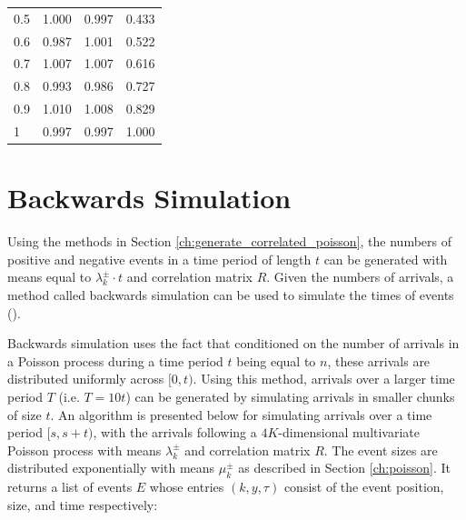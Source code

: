 \begin{table}
\begin{tabular}{l|l|l|l}
0.5                 & 1.000                               & 0.997                           & 0.433               \\
0.6                 & 0.987                           & 1.001                           & 0.522               \\
0.7                 & 1.007                           & 1.007                           & 0.616               \\
0.8                 & 0.993                           & 0.986                           & 0.727               \\
0.9                 & 1.010                            & 1.008                           & 0.829               \\
1                   & 0.997                           & 0.997                           & 1.000                  
\end{tabular}
\end{table}

\section{Backwards Simulation} \label{ch:backwards_simulation}

Using the methods in Section \ref{ch:generate_correlated_poisson}, the numbers of positive and negative events in a time period of length $t$ can be generated with means equal to $\lambda^{\pm}_k \cdot t$ and correlation matrix $R$. Given the numbers of arrivals, a method called backwards simulation can be used to simulate the times of events (\cite{A7}). 

Backwards simulation uses the fact that conditioned on the number of arrivals in a Poisson process during a time period $t$ being equal to $n$, these arrivals are distributed uniformly across $[0,t)$. Using this method, arrivals over a larger time period $T$ (i.e. $T = 10t$) can be generated by simulating arrivals in smaller chunks of size $t$. An algorithm is presented below for simulating arrivals over a time period $[s,s+t)$, with the arrivals following a $4K$-dimensional multivariate Poisson process with means $\lambda^{\pm}_k$ and correlation matrix $R$. The event sizes are distributed exponentially with means $\mu^{\pm}_k$ as described in Section \ref{ch:poisson}. It returns a list of events $E$ whose entries $(k,y,\tau)$ consist of the event position, size, and time respectively:
$$ $$

